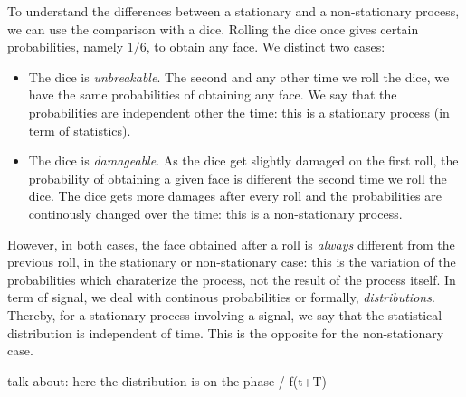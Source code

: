 \documentclass[12pt]{report}
\begin{document}
To understand the differences between a stationary and a non-stationary process, we can use the comparison with a dice. Rolling the dice once gives certain probabilities, namely $1/6$, to obtain any face. We distinct two cases:
\begin{itemize}
	\item The dice is \textit{unbreakable}. The second and any other time we roll the dice, we have the same probabilities of obtaining any face. We say that the probabilities are independent other the time: this is a stationary process (in term of statistics).
	\item The dice is \textit{damageable}. As the dice get slightly damaged on the first roll, the probability of obtaining a given face is different the second time we roll the dice. The dice gets more damages after every roll and the probabilities are continously changed over the time: this is a non-stationary process.
\end{itemize}
However, in both cases, the face obtained after a roll is \textit{always} different from the previous roll, in the stationary or non-stationary case: this is the variation of the probabilities which charaterize the process, not the result of the process itself. In term of signal, we deal with continous probabilities or formally, \textit{distributions}. Thereby, for a stationary process involving a signal, we say that the statistical distribution is independent of time. This is the opposite for the non-stationary case.

talk about: here the distribution is on the phase / f(t+T)
\end{document}
